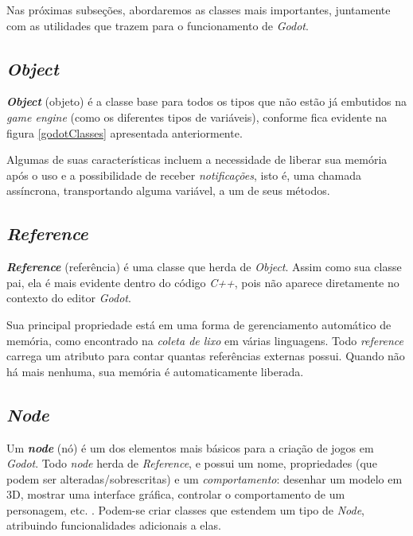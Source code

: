 Nas próximas subseções, abordaremos as classes mais importantes, juntamente com as utilidades que trazem para o funcionamento de \textit{Godot}.


\subsection{\textit{Object}}

\textbf{\textit{Object}} (objeto) é a classe base para todos os tipos que não estão já embutidos na \textit{game engine} (como os diferentes tipos de variáveis), conforme fica evidente na figura \ref{godotClasses} apresentada anteriormente.

Algumas de suas características incluem a necessidade de liberar sua memória após o uso e a possibilidade de receber \emph{notificações}, isto é, uma chamada assíncrona, transportando alguma variável, a um de seus métodos.


\subsection{\textit{Reference}}

\textbf{\textit{Reference}} (referência) é uma classe que herda de \textit{Object}. Assim como sua classe pai, ela é mais evidente dentro do código \textit{C++}, pois não aparece diretamente no contexto do editor \textit{Godot}.

Sua principal propriedade está em uma forma de gerenciamento automático de memória, como encontrado na \textit{coleta de lixo} em várias linguagens. Todo \textit{reference} carrega um atributo para contar quantas referências externas possui. Quando não há mais nenhuma, sua memória é automaticamente liberada.


\subsection{\textit{Node}}
\label{godotNode}

Um \textbf{\textit{node}} (nó) é um dos elementos mais básicos para a criação de jogos em \textit{Godot}. Todo \textit{node} herda de \textit{Reference}, e possui um nome, propriedades (que podem ser alteradas/sobrescritas) e um \emph{comportamento}: desenhar um modelo em 3D, mostrar uma interface gráfica, controlar o comportamento de um personagem, etc. \citep{godotNode}. Podem-se criar classes que estendem um tipo de \textit{Node}, atribuindo funcionalidades adicionais a elas.

